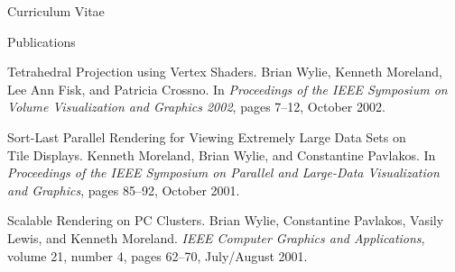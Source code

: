 \documentclass{article}
\begin{document}
\begin{cv}{Curriculum Vitae}
\begin{cvlist}{Publications}
    \item[Tetrahedral Projection using Vertex Shaders.] Brian Wylie,
      Kenneth Moreland, Lee Ann Fisk, and Patricia Crossno.  In
      \emph{Proceedings of the IEEE Symposium on Volume Visualization and
        Graphics 2002}, pages 7--12, October 2002.
    \item[Sort-Last Parallel Rendering for Viewing Extremely Large Data
      Sets on]~\\ Tile Displays. Kenneth Moreland, Brian Wylie, and
      Constantine Pavlakos.  In \emph{Proceedings of the IEEE Symposium on
        Parallel and Large-Data Visualization and Graphics}, pages 85--92,
      October 2001.
    \item[Scalable Rendering on PC Clusters.] Brian Wylie, Constantine
      Pavlakos, Vasily Lewis, and Kenneth Moreland.  \emph{IEEE Computer
        Graphics and Applications}, volume 21, number 4, pages 62--70,
      July/August 2001.
    \end{cvlist}


\end{cv}
\end{document}
